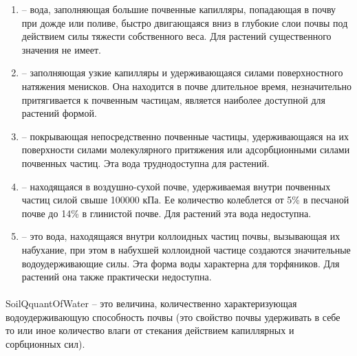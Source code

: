 \begin{enumerate}

	\item {} -- вода, заполняющая большие почвенные капилляры, попадающая в почву при дожде или поливе, быстро двигающаяся вниз в глубокие слои почвы под действием силы тяжести собственного веса. Для растений существенного значения не имеет.

	\item {} -- заполняющая узкие капилляры и удерживающаяся силами поверхностного натяжения менисков. Она находится в почве длительное время, незначительно притягивается к почвенным частицам, является наиболее доступной для растений формой.

	\item {} -- покрывающая непосредственно почвенные частицы, удерживающаяся на их поверхности силами молекулярного притяжения или адсорбционными силами почвенных частиц. Эта вода труднодоступна для растений.

	\item {} --  находящаяся в воздушно-сухой почве, удерживаемая внутри почвенных частиц силой свыше 100000 кПа. Ее количество колеблется от 5\% в песчаной почве до 14\% в глинистой почве. Для растений эта вода недоступна.

	\item {} -- это вода, находящаяся внутри коллоидных частиц почвы, вызывающая их набухание, при этом в набухшей коллоидной частице создаются значительные водоудерживающие силы. Эта форма воды характерна для торфяников. Для растений она также практически недоступна.

\end{enumerate}

\paragraph*{}

\paragraph*{}\gls{SoilQquantOfWater} -- это величина, количественно характеризующая водоудерживающую способность почвы (это свойство почвы удерживать в себе то или иное количество влаги от стекания действием капиллярных и сорбционных сил).

